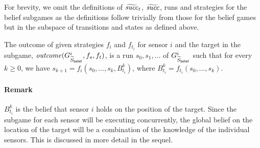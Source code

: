  For brevity, we omit the definitions of $\widetilde{\mathit{succ}}_t$, $\widetilde{\mathit{succ}}$, runs and strategies for the belief subgames as the definitions follow trivially from those for the belief games but in the subspace of transitions and states as defined above.

The outcome of given strategies $f_{i}$ and $f_{t_i}$ for sensor $i$ and the target in the subgame, $\mathit{outcome}(G^{i}_{\widetilde{S}_{\mathsf{belief}}},f_s,f_t)$, is a run $s_0,s_1,\ldots$ of $G^{i}_{\widetilde{S}_{\mathsf{belief}}}$ such that for every $k \geq 0$, we have $s_{k+1} = f_i(s_0,\ldots,s_k,B^k_{t_i})$, where $B^k_{t_i} = f_{t_i}(s_0,\ldots,s_k)$.

\paragraph*{Remark}$B^k_{t_i}$ is the belief that sensor $i$ holds on the position of the target. Since the subgame for each sensor will be executing concurrently, the global belief on the location of the target will be a combination of the knowledge of the individual sensors. This is discussed in more detail in the sequel.

